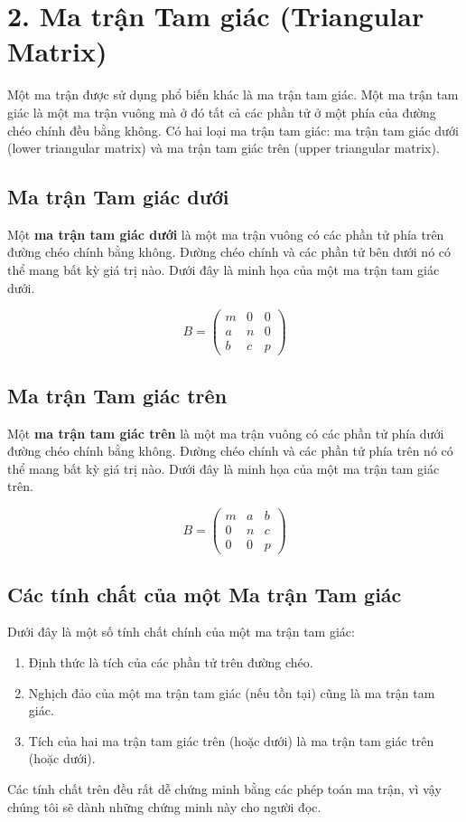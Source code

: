 \section{2. Ma trận Tam giác (Triangular Matrix)}

Một ma trận được sử dụng phổ biến khác là ma trận tam giác. Một ma trận tam giác là một ma trận vuông mà ở đó tất cả các phần tử ở một phía của đường chéo chính đều bằng không. Có hai loại ma trận tam giác: ma trận tam giác dưới (lower triangular matrix) và ma trận tam giác trên (upper triangular matrix).

\subsection{Ma trận Tam giác dưới}

Một \textbf{ma trận tam giác dưới} là một ma trận vuông có các phần tử phía trên đường chéo chính bằng không. Đường chéo chính và các phần tử bên dưới nó có thể mang bất kỳ giá trị nào. Dưới đây là minh họa của một ma trận tam giác dưới.

\[B = \begin{pmatrix} m & 0 & 0 \\ a & n & 0 \\ b & c & p \end{pmatrix}\]

\subsection{Ma trận Tam giác trên}

Một \textbf{ma trận tam giác trên} là một ma trận vuông có các phần tử phía dưới đường chéo chính bằng không. Đường chéo chính và các phần tử phía trên nó có thể mang bất kỳ giá trị nào. Dưới đây là minh họa của một ma trận tam giác trên.

\[B = \begin{pmatrix} m & a & b \\ 0 & n & c \\ 0 & 0 & p \end{pmatrix}\]

\subsection{Các tính chất của một Ma trận Tam giác}

Dưới đây là một số tính chất chính của một ma trận tam giác:

\begin{enumerate}
  \item Định thức là tích của các phần tử trên đường chéo.
  \item Nghịch đảo của một ma trận tam giác (nếu tồn tại) cũng là ma trận tam giác.
  \item Tích của hai ma trận tam giác trên (hoặc dưới) là ma trận tam giác trên (hoặc dưới).
\end{enumerate}
Các tính chất trên đều rất dễ chứng minh bằng các phép toán ma trận, vì vậy chúng tôi sẽ dành những chứng minh này cho người đọc.

